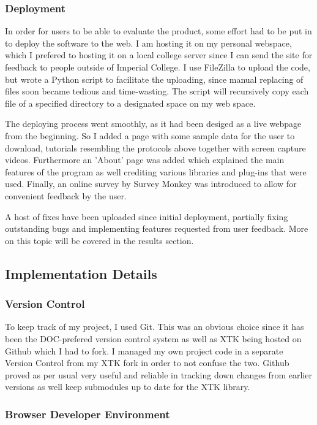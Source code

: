 \documentclass[a4paper,11pt,titlepage]{article}
\begin{document}
\subsubsection{Deployment}


In order for users to be able to evaluate the product, some effort had to be put in to deploy the software to the web. I am hosting it on my personal webspace, which I prefered to hosting it on a local college server since I can send the site for feedback to people outside of Imperial College. I use FileZilla to upload the code, but wrote a Python script to facilitate the uploading, since manual replacing of files soon became tedious and time-wasting. The script will recursively copy each file of a specified directory to a designated space on my web space.

The deploying process went smoothly, as it had been desiged as a live webpage from the beginning. So I added a page with some sample data for the user to download, tutorials resembling the protocols above together with screen capture videos. Furthermore an 'About' page was added which explained the main features of the program as well crediting various libraries and plug-ins that were used. Finally, an online survey by Survey Monkey was introduced to allow for convenient feedback by the user.

A host of fixes have been uploaded since initial deployment, partially fixing outstanding bugs and implementing features requested from user feedback. More on this topic will be covered in the results section.


\subsection{Implementation Details}

\subsubsection{Version Control}

To keep track of my project, I used Git. This was an obvious choice since it has been the DOC-prefered version control system as well as XTK being hosted on Github which I had to fork. I managed my own project code in a separate Version Control from my XTK fork in order to not confuse the two. Github proved as per usual very useful and reliable in tracking down changes from earlier versions as well keep submodules up to date for the XTK library. 


\subsubsection{Browser Developer Environment}
\end{document}
